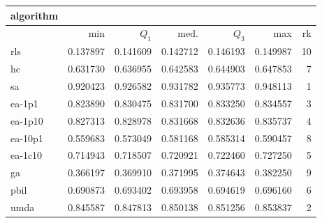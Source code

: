 \begin{tabular}{@{}l*{5}{>{{}}N{1}{3}}>{{}}N{2}{0}@{}}
\toprule
{algorithm} &  \\
\midrule
& {min} & {$Q_1$} & {med.} & {$Q_3$} & {max} & {rk}\\
\midrule
rls & 0.137897 & 0.141609 & 0.142712 & 0.146193 & 0.149987 & 10\\
hc & 0.631730 & 0.636955 & 0.642583 & 0.644903 & 0.647853 & 7\\
sa & {\color{blue}} 0.920423 & {\color{blue}} 0.926582 & {\color{blue}} 0.931782 & {\color{blue}} 0.935773 & {\color{blue}} 0.948113 & 1\\
ea-1p1 & 0.823890 & 0.830475 & 0.831700 & 0.833250 & 0.834557 & 3\\
ea-1p10 & 0.827313 & 0.828978 & 0.831668 & 0.832636 & 0.835737 & 4\\
ea-10p1 & 0.559683 & 0.573049 & 0.581168 & 0.585314 & 0.590457 & 8\\
ea-1c10 & 0.714943 & 0.718507 & 0.720921 & 0.722460 & 0.727250 & 5\\
ga & 0.366197 & 0.369910 & 0.371995 & 0.374643 & 0.382250 & 9\\
pbil & 0.690873 & 0.693402 & 0.693958 & 0.694619 & 0.696160 & 6\\
umda & 0.845587 & 0.847813 & 0.850138 & 0.851256 & 0.853837 & 2\\
\bottomrule
\end{tabular}
